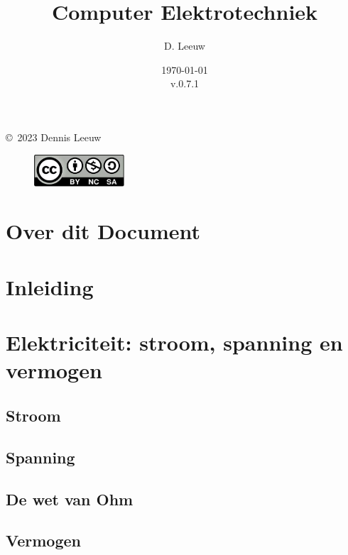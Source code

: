 \documentclass[a4paper,12pt,twoside,openright,titlepage]{book}
\author{D. Leeuw}
\title{Computer Elektrotechniek}
\date{\today\\v.0.7.1}
\begin{document}

\maketitle

\copyright\ 2023 Dennis Leeuw\\

\begin{figure}
\includegraphics[width=0.3\textwidth]{CC-BY-SA-NC.png}
\end{figure}

\bigskip




\frontmatter
\chapter{Over dit Document}



\tableofcontents

\mainmatter
\chapter{Inleiding}


\chapter{Elektriciteit: stroom, spanning en vermogen}

\section{Stroom}

\section{Spanning}

\section{De wet van Ohm}

\section{Vermogen}

\end{document}
